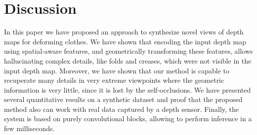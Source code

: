 \section{Discussion}

In this paper we have proposed an approach to synthesize novel views of depth maps for deforming clothes.  We have shown that encoding the input depth map using spatial-aware features, and geometrically transforming these features, allows hallucinating complex details, like folds and creases, which were not visible in the input depth map. Moreover, we have shown that our method is capable to recuperate many details in very extreme viewpoints where the geometric information is very little, since it is lost by the self-occlusions.
We have presented several quantitative results on a synthetic dataset and proof that the proposed method also can work with real data captured by a depth sensor. Finally, the system is based on purely convolutional blocks, allowing to  perform inference in a few milliseconds.
